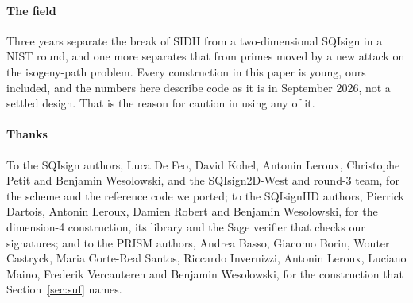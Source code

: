\documentclass[11pt]{article}
\begin{document}
\paragraph{The field}
Three years separate the break of SIDH from a two-dimensional SQIsign in a
NIST round, and one more separates that from primes moved by a new
attack on the isogeny-path problem.  Every construction in this paper is
young, ours included, and the numbers here describe code as it is in
September 2026, not a settled design.  That is the reason for caution in
using any of it.

\paragraph{Thanks}
To the SQIsign authors, Luca De Feo, David Kohel, Antonin Leroux,
Christophe Petit and Benjamin Wesolowski, and the SQIsign2D-West and
round-3 team, for the scheme and the reference code we ported; to the
SQIsignHD authors, Pierrick Dartois, Antonin Leroux, Damien Robert and
Benjamin Wesolowski, for the dimension-4 construction, its library and the
Sage verifier that checks our signatures; and to the PRISM authors,
Andrea Basso, Giacomo Borin, Wouter Castryck, Maria Corte-Real Santos,
Riccardo Invernizzi, Antonin Leroux, Luciano Maino, Frederik Vercauteren
and Benjamin Wesolowski, for the construction that Section~\ref{sec:suf}
names.



\end{document}
